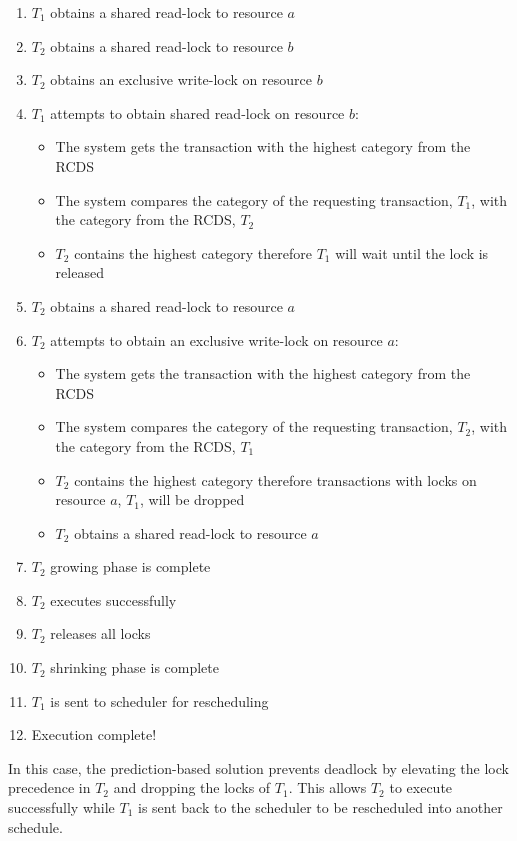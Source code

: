 \documentclass[conference]{IEEEtran}
\begin{document}
\begin{enumerate}
  \item $T_{1}$ obtains a shared read-lock to resource $a$
  \item $T_{2}$ obtains a shared read-lock to resource $b$
  \item $T_{2}$ obtains an exclusive write-lock on resource $b$
  \item $T_{1}$ attempts to obtain shared read-lock on resource $b$:
    \begin{itemize}
        \item The system gets the transaction with the highest category from the RCDS
        \item The system compares the category of the requesting transaction, $T_{1}$, with the category from the RCDS, $T_{2}$
        \item $T_{2}$ contains the highest category therefore $T_{1}$ will wait until the lock is released
    \end{itemize}
  \item $T_{2}$ obtains a shared read-lock to resource $a$
  \item $T_{2}$ attempts to obtain an exclusive write-lock on resource $a$:
    \begin{itemize}
        \item The system gets the transaction with the highest category from the RCDS
        \item The system compares the category of the requesting transaction, $T_{2}$, with the category from the RCDS, $T_{1}$
        \item $T_{2}$ contains the highest category therefore transactions with locks on resource $a$, $T_{1}$, will be dropped
        \item $T_{2}$ obtains a shared read-lock to resource $a$
    \end{itemize}    
  \item $T_{2}$ growing phase is complete
  \item $T_{2}$ executes successfully
  \item $T_{2}$ releases all locks
  \item $T_{2}$ shrinking phase is complete
  \item $T_{1}$ is sent to scheduler for rescheduling
  \item Execution complete!
\end{enumerate}

In this case, the prediction-based solution prevents deadlock by elevating the lock precedence in $T_{2}$ and dropping the locks of $T_{1}$. This allows $T_{2}$ to execute successfully while $T_{1}$ is sent back to the scheduler to be rescheduled into another schedule.
\end{document}
